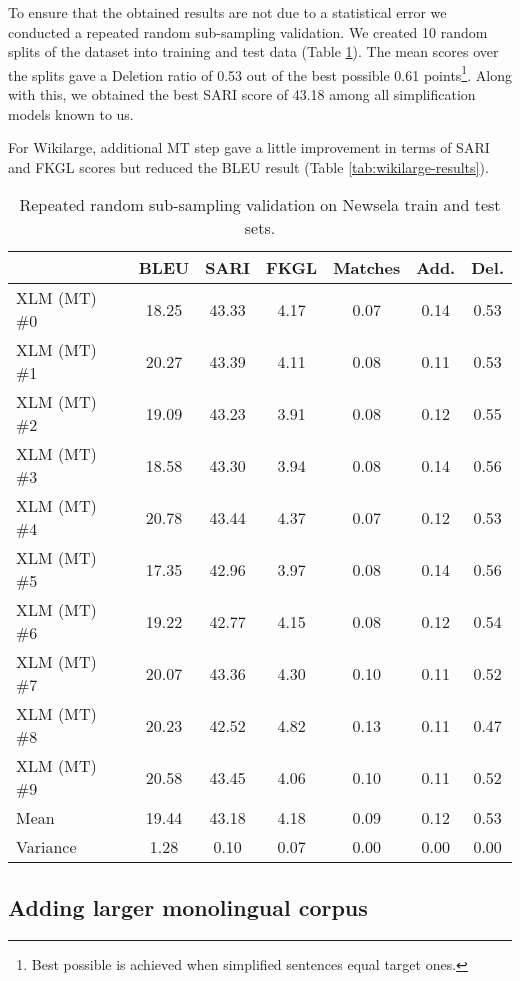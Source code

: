 To ensure that the obtained results are not due to a statistical error we conducted a repeated random sub-sampling validation. We created 10 random splits of the dataset into training and test data (Table \ref{tab:newsela-sub-sampling}). The mean scores over the splits gave a Deletion ratio of 0.53 out of the best possible 0.61 points\footnote{{Best possible is achieved when simplified sentences equal target ones.}}. Along with this, we obtained the best SARI score of 43.18 among all simplification models known to us.

For Wikilarge, additional MT step gave a little improvement in terms of SARI and FKGL scores but reduced the BLEU result (Table \ref{tab:wikilarge-results}).

\begin{table}
\centering
\begin{tabular}{m{3cm}cccccc}
\hline
\textbf{} & \textbf{BLEU} & \textbf{SARI} & \textbf{FKGL} & \textbf{Matches} & \textbf{Add.} & \textbf{Del.} \\
\hline
XLM (MT) \#0 & 18.25 & 43.33 & 4.17 & 0.07 & 0.14 & 0.53 \\
XLM (MT) \#1 & 20.27 & 43.39 & 4.11 & 0.08 & 0.11 & 0.53 \\
XLM (MT) \#2 & 19.09 & 43.23 & 3.91 & 0.08 & 0.12 & 0.55  \\
XLM (MT) \#3 & 18.58 & 43.30 & 3.94 & 0.08 & 0.14 & 0.56 \\
XLM (MT) \#4 & 20.78 & 43.44 & 4.37 & 0.07 & 0.12 & 0.53 \\
XLM (MT) \#5 & 17.35 & 42.96 & 3.97 & 0.08 & 0.14 & 0.56 \\
XLM (MT) \#6 & 19.22 & 42.77 & 4.15 & 0.08 & 0.12 & 0.54 \\
XLM (MT) \#7 & 20.07 & 43.36 & 4.30 & 0.10 & 0.11 & 0.52 \\
XLM (MT) \#8 & 20.23 & 42.52 & 4.82 & 0.13 & 0.11 & 0.47 \\
XLM (MT) \#9 & 20.58 & 43.45 & 4.06 & 0.10 & 0.11 & 0.52 \\
\hline
Mean & 19.44 & 43.18 & 4.18 & 0.09 & 0.12 & 0.53 \\
Variance & 1.28 & 0.10 &  0.07 & 0.00 & 0.00 & 0.00 \\
\end{tabular}
\caption{Repeated random sub-sampling validation on Newsela train and test sets.}
\label{tab:newsela-sub-sampling}
\end{table}

\subsection{Adding larger monolingual corpus}

